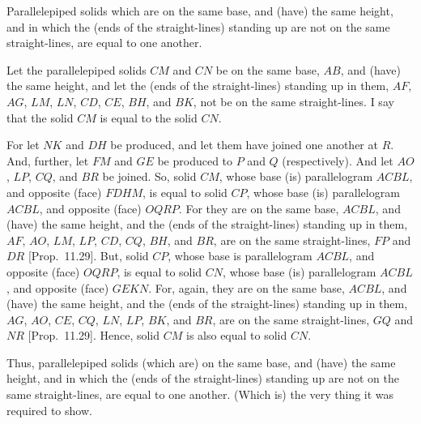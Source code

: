 \begin{Parallel}{}{}
{Parallelepiped solids which are on the same base,
and (have) the same height, and in which the (ends of the straight-lines)
standing up are not on the same straight-lines, are equal to one another.

\epsfysize=2.2in
\centerline{}

Let the parallelepiped solids $CM$ and $CN$ be on the same base, $AB$,
and (have) the same height, and let the (ends of the straight-lines)
standing up in them, $AF$, $AG$, $LM$, $LN$, $CD$, $CE$, $BH$,
and $BK$, not be on the same straight-lines. I say that the solid $CM$
is equal to the solid $CN$.

For let $NK$ and $DH$ be produced, and let them have joined
one another at $R$. And, further, let $FM$ and $GE$ be produced
to $P$ and $Q$ (respectively). And let $AO$, $LP$, $CQ$, and
$BR$ be joined. So, solid $CM$, whose base (is)
parallelogram $ACBL$, and opposite (face) $FDHM$, is equal to solid
$CP$, whose base (is) parallelogram $ACBL$, and opposite
(face) $OQRP$. For they are on the same base, $ACBL$, and (have) the
same height, and the (ends of the straight-lines) standing up in them,
$AF$, $AO$, $LM$, $LP$, $CD$, $CQ$, $BH$, and $BR$, are on the
same straight-lines, $FP$ and $DR$ [Prop.~11.29]. 
But,  solid $CP$, whose base is parallelogram
$ACBL$, and opposite (face) $OQRP$, is equal to solid
$CN$, whose base (is) parallelogram $ACBL$, and opposite (face)
$GEKN$. For, again, they are on the same base, $ACBL$,
and (have) the same height, and the (ends of the straight-lines) standing up
in them, $AG$, $AO$, $CE$, $CQ$, $LN$, $LP$, $BK$, and $BR$,
are on the same straight-lines, $GQ$ and $NR$ [Prop.~11.29]. Hence, solid $CM$ is also equal to solid $CN$.

Thus, parallelepiped solids (which are) on the same base,
and (have) the same height, and in which the (ends of the straight-lines)
standing up are not on the same straight-lines, are equal to one another.
(Which is) the very thing it was required to show.}
\end{Parallel}

